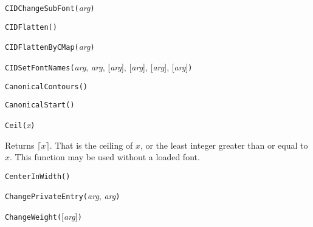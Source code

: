 

\texttt{CIDChangeSubFont(}\textit{arg}\texttt{)}



\texttt{CIDFlatten(}\texttt{)}



\texttt{CIDFlattenByCMap(}\textit{arg}\texttt{)}



\texttt{CIDSetFontNames(}\textit{arg}, \textit{arg}, [\textit{arg}], [\textit{arg}], [\textit{arg}], [\textit{arg}]\texttt{)}



\texttt{CanonicalContours(}\texttt{)}



\texttt{CanonicalStart(}\texttt{)}



\texttt{Ceil(}\textit{x}\texttt{)}

Returns $\lceil x \rceil$.  That is the ceiling of $x$, or the least
integer greater than or equal to $x$.  This function may be used without a
loaded font.



\texttt{CenterInWidth(}\texttt{)}



\texttt{ChangePrivateEntry(}\textit{arg}, \textit{arg}\texttt{)}



\texttt{ChangeWeight(}[\textit{arg}]\texttt{)}


